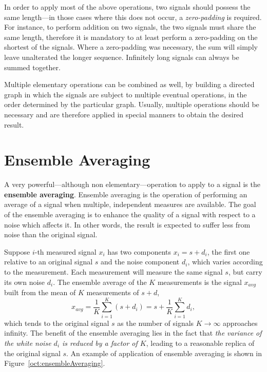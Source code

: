 \documentclass[\documentfontsize, twocolumn]{\classname}
\begin{document}
In order to apply most of the above operations, two signals should possess the same length---in those cases where this does not occur, a \emph{zero-padding} is required. For instance, to perform addition on two signals, the two signals must share the same length, therefore it is mandatory to at least perform a zero-padding on the shortest of the signals. Where a zero-padding was necessary, the sum will simply leave unalterated the longer sequence. Infinitely long signals can always be summed together.

Multiple elementary operations can be combined as well, by building a directed graph in which the signals are subject to multiple eventual operations, in the order determined by the particular graph. Usually, multiple operations should be necessary and are therefore applied in special manners to obtain the desired result.

\section{Ensemble Averaging}

A very powerful---although non elementary---operation to apply to a signal is the \textbf{ensemble averaging}. Ensemble averaging is the operation of performing an average of a signal when multiple, independent measures are available. The goal of the ensemble averaging is to enhance the quality of a signal with respect to a noise which affects it. In other words, the result is expected to suffer less from noise than the original signal.

Suppose $i$-th measured signal $x_i$ has two components $x_i = s + d_i$, the
first one relative to an original signal $s$ and the noise component $d_i$, which
varies according to the measurement. Each measurement will measure the same signal $s$, but carry its own noise $d_i$. The ensemble average of the $K$ measurements is the signal $x_{avg}$ built from the mean of $K$ measurements of $s + d$,
\begin{equation}\label{eqn:EnsambleAveraging}
	x_{avg} = \frac{1}{K}\sum_{i=1}^{K} (s + d_i) = s + \frac{1}{K}\sum_{i=1}^{K}d_i,
\end{equation}
which tends to the original signal $s$ as the number of signals $K \rightarrow \infty$ approaches infinity. The benefit of the ensemble averaging lies in the fact that \emph{the variance of the white noise $d_i$ is reduced by a factor of $K$}, leading to a reasonable replica of the original signal $s$. An example of application of ensemble averaging is shown in Figure~\ref{oct:ensembleAveraging}.
\end{document}
